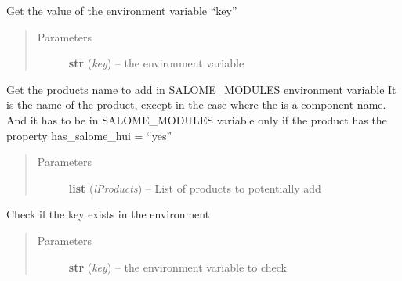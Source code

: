 \documentclass[a4paper,10pt,english]{sphinxmanual}
\begin{document}
\begin{fulllineitems}
\begin{fulllineitems}
\begin{quote}
\begin{description}
\end{description}\end{quote}

\end{fulllineitems}


\begin{fulllineitems}
\label{commands/apidoc/src:src.environment.SalomeEnviron.get}
Get the value of the environment variable ``key''
\begin{quote}\begin{description}
\item[{Parameters}] \leavevmode
\textbf{str} (\emph{key}) -- the environment variable

\end{description}\end{quote}

\end{fulllineitems}


\begin{fulllineitems}
\label{commands/apidoc/src:src.environment.SalomeEnviron.get_names}
Get the products name to add in SALOME\_MODULES environment variable
It is the name of the product, except in the case where the is a 
component name. And it has to be in SALOME\_MODULES variable only 
if the product has the property has\_salome\_hui = ``yes''
\begin{quote}\begin{description}
\item[{Parameters}] \leavevmode
\textbf{list} (\emph{lProducts}) -- List of products to potentially add

\end{description}\end{quote}

\end{fulllineitems}


\begin{fulllineitems}
\label{commands/apidoc/src:src.environment.SalomeEnviron.is_defined}
Check if the key exists in the environment
\begin{quote}\begin{description}
\item[{Parameters}] \leavevmode
\textbf{str} (\emph{key}) -- the environment variable to check


\end{description}
\end{quote}
\end{fulllineitems}
\end{fulllineitems}
\end{document}
